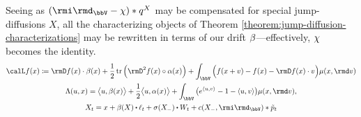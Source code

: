 Seeing as $(\id_\vecSpace - \trunc) \ast \jumpMeas^\X$ may be compensated for special jump-diffusions $X$, all the characterizing objects of Theorem \ref{theorem:jump-diffusion-characterizations} may be rewritten in terms of our drift $\beta$---effectively, $\chi$ becomes the identity.
\begin{gather*}
  \generator f(\stateVar) \defeq \Der f(\stateVar) \cdot \affDrift(\stateVar) + \frac12 \tr\Big( \Hess f(\stateVar) \circ \affDiff(\stateVar) \Big) + \int_\vecSpace \Big( f(\stateVar + \markVar) - f(\stateVar) - \Der f(\stateVar) \cdot \markVar \Big) \affJump(\stateVar, \rmd\markVar) \\
  \ode(\momentVar, \stateVar) = \bprj{\momentVar}{\affDrift(\stateVar)} + \frac12\bprj{\momentVar}{\affDiff(\stateVar)} + \int_\vecSpace \big( e^\prj{\momentVar}{\markVar} - 1 - \prj{\momentVar}{\markVar} \big) \affJump(\stateVar, \rmd\markVar), \\
  \X_t = \stateVar + \affDrift(\X) \shortInt \leb_t + \sigma(\X_-) \shortInt \W_t + \thinner(\X_-, \id_\vecSpace) \ast \compensate{\poisRM}_t 
\end{gather*}
